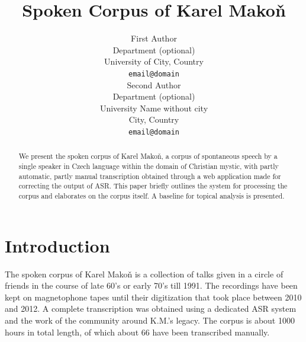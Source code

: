 \documentclass[a4paper,11pt]{article}
\title{Spoken Corpus of Karel Mako\v{n}}
\author{First Author \\
  Department (optional)\\
  University of City, Country \\
  {\tt email@domain} \\\And %
  Second Author \\
  Department (optional)\\
  University Name without city \\
  City, Country \\
 {\tt email@domain} \\
}
\date{}
\begin{document}
\maketitle
\begin{abstract}
  We present the spoken corpus of Karel Mako\v{n}, a corpus of spontaneous
  speech by a single speaker in Czech language within the domain of Christian
  mystic, with partly automatic, partly manual transcription obtained through a
  web application made for correcting the output of ASR.
  This paper briefly outlines the system for processing the corpus and
  elaborates on the corpus itself. A baseline for topical analysis is presented.
\end{abstract}

\section{Introduction} \label{intro}

%

The spoken corpus of Karel Mako\v{n} is a collection of talks given in a circle
of friends in the course of late 60's or early 70's till 1991. The recordings
have been kept on magnetophone tapes until their digitization that took place
between 2010 and 2012. A complete transcription was obtained using a dedicated
ASR system and the work of the community around K.M.'s legacy. The corpus is
about 1000 hours in total length, of which about 66 have been transcribed
manually.
\end{document}
